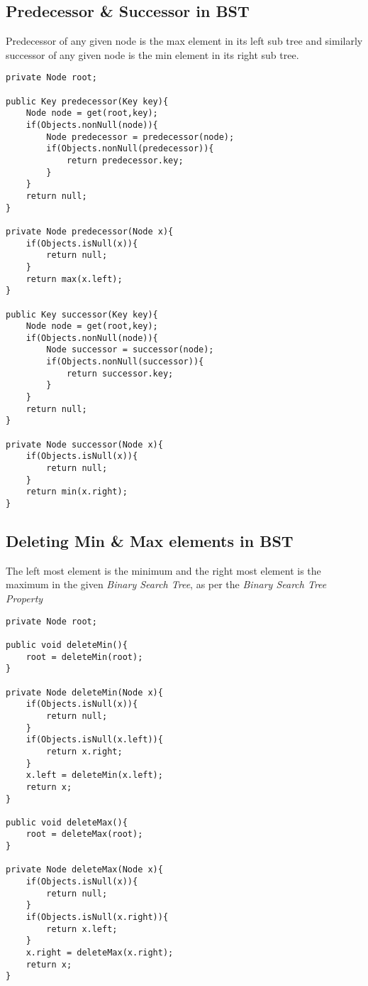\documentclass[12pt,a4paper,draft]{article}
\begin{document}
\subsection{Predecessor \& Successor in BST}
Predecessor of any given node is the max element in its left sub tree and similarly successor of any given node is the min element in its right sub tree.

\begin{lstlisting}[caption={Predecessor \& Successor Operation}]
private Node root;

public Key predecessor(Key key){
	Node node = get(root,key);
	if(Objects.nonNull(node)){
		Node predecessor = predecessor(node);
		if(Objects.nonNull(predecessor)){
			return predecessor.key;
		}
	}
	return null;
}

private Node predecessor(Node x){
	if(Objects.isNull(x)){
		return null;
	}
	return max(x.left);
}

public Key successor(Key key){
	Node node = get(root,key);
	if(Objects.nonNull(node)){
		Node successor = successor(node);
		if(Objects.nonNull(successor)){
			return successor.key;
		}
	}
	return null;
}

private Node successor(Node x){
	if(Objects.isNull(x)){
		return null;
	}
	return min(x.right);
}	
\end{lstlisting}
\pagebreak
\subsection{Deleting Min \& Max elements in BST}
The left most element is the minimum and the right most element is the maximum in the given \emph{Binary Search Tree}, as per the \emph{Binary Search Tree Property}

\begin{lstlisting}[caption={Deleting Min \& Max Operation}]
private Node root;

public void deleteMin(){
	root = deleteMin(root);
}

private Node deleteMin(Node x){
	if(Objects.isNull(x)){
		return null;
	}
	if(Objects.isNull(x.left)){
		return x.right;
	}
	x.left = deleteMin(x.left);
	return x;
}

public void deleteMax(){
	root = deleteMax(root);
}

private Node deleteMax(Node x){
	if(Objects.isNull(x)){
		return null;
	}
	if(Objects.isNull(x.right)){
		return x.left;
	}
	x.right = deleteMax(x.right);
	return x;
}
\end{lstlisting}
\pagebreak
\end{document}
